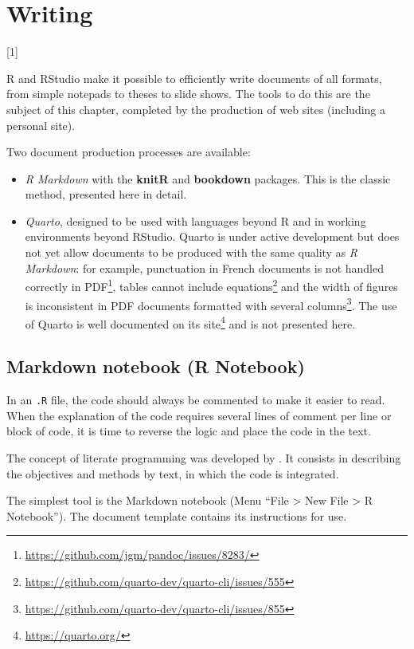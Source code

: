 \documentclass[
  12pt,
  american,
  a4paper,
  extrafontsizes,onecolumn,openright
  ]{memoir}
\providecommand{\tightlist}{%
  \setlength{\itemsep}{0pt}\setlength{\parskip}{0pt}}
\newcommand{\toc}[1]{%
  \startcontents[chapters]%
  \printcontents[chapters]{}{1}[#1]{}%
  ~\newline%
}
\begin{document}
\chapter{Writing}\label{chap-rediger}

\toc{1}

R and RStudio make it possible to efficiently write documents of all formats, from simple notepads to theses to slide shows.
The tools to do this are the subject of this chapter, completed by the production of web sites (including a personal site).

Two document production processes are available:

\begin{itemize}
\tightlist
\item
  \emph{R Markdown} with the \textbf{knitR} and \textbf{bookdown} packages.
  This is the classic method, presented here in detail.
\item
  \emph{Quarto}, designed to be used with languages beyond R and in working environments beyond RStudio.
  Quarto is under active development but does not yet allow documents to be produced with the same quality as \emph{R Markdown}: for example, punctuation in French documents is not handled correctly in PDF\footnote{\url{https://github.com/jgm/pandoc/issues/8283/}}, tables cannot include equations\footnote{\url{https://github.com/quarto-dev/quarto-cli/issues/555}} and the width of figures is inconsistent in PDF documents formatted with several columns\footnote{\url{https://github.com/quarto-dev/quarto-cli/issues/855}}.
  The use of Quarto is well documented on its site\footnote{\url{https://quarto.org/}} and is not presented here.
\end{itemize}

\section{Markdown notebook (R Notebook)}\label{markdown-notebook-r-notebook}

In an \texttt{.R} file, the code should always be commented to make it easier to read.
When the explanation of the code requires several lines of comment per line or block of code, it is time to reverse the logic and place the code in the text.

The concept of literate programming was developed by \textcite{Knuth1984}.
It consists in describing the objectives and methods by text, in which the code is integrated.

The simplest tool is the Markdown notebook (Menu \enquote{File \textgreater{} New File \textgreater{} R Notebook}).
The document template contains its instructions for use.
\end{document}
